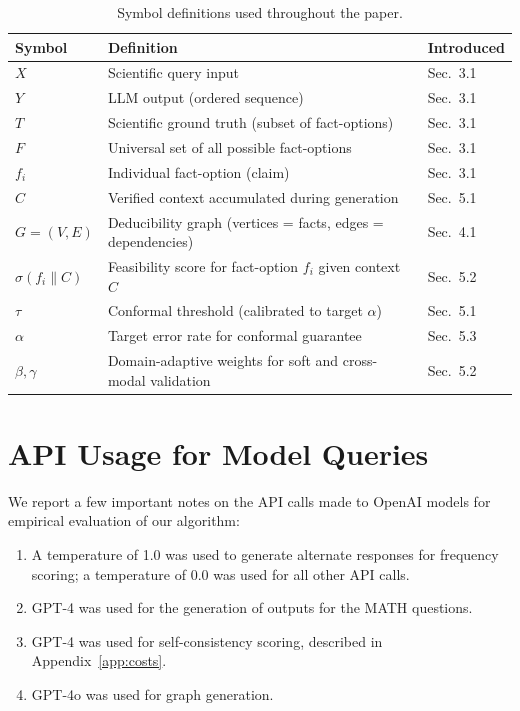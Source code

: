 \documentclass{uai2026} %
\theoremstyle{remark}
\theoremstyle{plain}
\theoremstyle{definition}
\begin{document}
\begin{table}[ht]
\centering


\caption{Symbol definitions used throughout the paper.}
\label{tab:symbol_definitions}
\begin{tabular}{lll}
\toprule
\textbf{Symbol} & \textbf{Definition} & \textbf{Introduced} \\
\midrule
$X$ & Scientific query input & Sec.~3.1 \\
$Y$ & LLM output (ordered sequence) & Sec.~3.1 \\
$T$ & Scientific ground truth (subset of fact-options) & Sec.~3.1 \\
$F$ & Universal set of all possible fact-options & Sec.~3.1 \\
$f_i$ & Individual fact-option (claim) & Sec.~3.1 \\
$C$ & Verified context accumulated during generation & Sec.~5.1 \\
$G = (V, E)$ & Deducibility graph (vertices = facts, edges = dependencies) & Sec.~4.1 \\
$\sigma(f_i \| C)$ & Feasibility score for fact-option $f_i$ given context $C$ & Sec.~5.2 \\
$\tau$ & Conformal threshold (calibrated to target $\alpha$) & Sec.~5.1 \\
$\alpha$ & Target error rate for conformal guarantee & Sec.~5.3 \\
$\beta, \gamma$ & Domain-adaptive weights for soft and cross-modal validation & Sec.~5.2 \\
\bottomrule
\end{tabular}
\end{table}
\section{API Usage for Model Queries}
\label{app:api-usage}

We report a few important notes on the API calls made to OpenAI models for empirical evaluation of our algorithm:

\begin{enumerate}
\item A temperature of 1.0 was used to generate alternate responses for frequency scoring; a temperature of 0.0 was used for all other API calls.
\item GPT-4 was used for the generation of outputs for the MATH questions.
\item GPT-4 was used for self-consistency scoring, described in Appendix~\ref{app:costs}.
\item GPT-4o was used for graph generation.
\end{enumerate}
\end{document}
